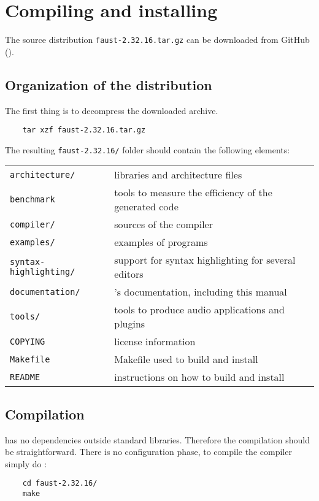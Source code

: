 \chapter{Compiling and installing \faust}

The \faust source distribution \lstinline'faust-2.32.16.tar.gz' can be downloaded from GitHub ().

\section{Organization of the distribution}
The first thing is to decompress the downloaded archive. 
\begin{lstlisting}
	tar xzf faust-2.32.16.tar.gz
\end{lstlisting}

The resulting  \lstinline'faust-2.32.16/' folder should contain the following elements:

\begin{tabular}{ll}
	\lstinline'architecture/' 		&\faust libraries and architecture files\\
	\lstinline'benchmark'			&tools to measure the efficiency of the generated code\\
	\lstinline'compiler/'			&sources of the \faust compiler\\
	\lstinline'examples/'			&examples of \faust programs\\
	\lstinline'syntax-highlighting/'&	support for syntax highlighting for several editors\\
	\lstinline'documentation/' 		&\faust's documentation, including this manual\\
	\lstinline'tools/'				&tools to produce audio applications and plugins\\
	\lstinline'COPYING'			&license information\\
	\lstinline'Makefile'			&Makefile used to build and install \faust\\
	\lstinline'README'			&instructions on how to build and install \faust
\end{tabular}

\section{Compilation}
\faust has no dependencies outside standard libraries. Therefore the compilation should be straightforward. There is no configuration phase, to compile the \faust compiler simply do :
\begin{lstlisting}
	cd faust-2.32.16/
	make
\end{lstlisting}


